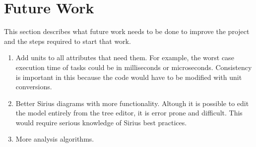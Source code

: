 \pagebreak
\section{Future Work}
This section describes what future work needs to be done to improve the project
and the steps required to start that work.
\begin{enumerate}
    \item Add units to all attributes that need them. For example,
    the worst case execution time of tasks could be in milliseconds
    or microseconds. Consistency is important in this because
    the code would have to be modified with unit conversions.
    \item Better Sirius diagrams with more functionality. Altough it
    is possible to edit the model entirely from the tree editor, it is
    error prone and difficult. This would require serious knowledge of
    Sirius best practices.
    \item More analysis algorithms.
\end{enumerate}
